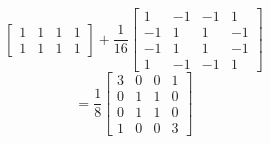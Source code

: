 \documentclass{assignment}
\begin{document}
\begin{problemlist}
\begin{answer}
\begin{enumerate}
\[\begin{bmatrix}
        1 & 1 & 1 & 1\\
        1 & 1 & 1 & 1
      \end{bmatrix}
      +\frac{1}{16}
      \begin{bmatrix}
        1 & -1 & -1 & 1\\
        -1 & 1 & 1 & -1\\
        -1 & 1 & 1 & -1\\
        1 & -1 & -1 & 1
      \end{bmatrix}
      \]
      \[
      =\frac{1}{8}
      \begin{bmatrix}
        3 & 0 & 0 & 1\\
        0 & 1 & 1 & 0\\
        0 & 1 & 1 & 0\\
        1 & 0 & 0 & 3
      \end{bmatrix}
      \]
    \end{enumerate}
  \end{answer}


\end{problemlist}
\end{document}
